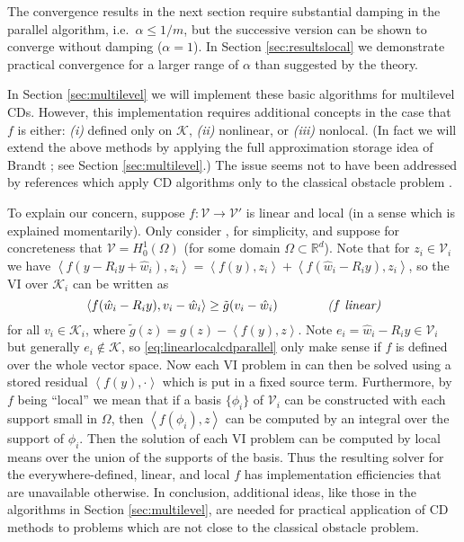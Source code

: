 \documentclass[letterpaper,final,12pt,reqno]{amsart}
\theoremstyle{cstyle}
\theoremstyle{dstyle}
\numberwithin{equation}{section}
\numberwithin{figure}{section}
\numberwithin{table}{section}
\numberwithin{theorem}{section}
\newcommand{\RR}{\mathbb{R}}
\newcommand{\cK}{\mathcal{K}}
\newcommand{\cV}{\mathcal{V}}
\newcommand{\ip}[2]{\left<#1,#2\right>}
\begin{document}
The convergence results in the next section require substantial damping in the parallel algorithm, i.e.~$\alpha \le 1/m$, but the successive version can be shown to converge without damping ($\alpha=1$).  In Section \ref{sec:resultslocal} we demonstrate practical convergence for a larger range of $\alpha$ than suggested by the theory.  %

In Section \ref{sec:multilevel} we will implement these basic algorithms for multilevel CDs.  However, this implementation requires additional concepts in the case that $f$ is either: \emph{(i)} defined only on $\cK$, \emph{(ii)} nonlinear, or \emph{(iii)} nonlocal.  (In fact we will extend the above methods by applying the full approximation storage idea of Brandt \cite{Brandt1977}; see Section \ref{sec:multilevel}.)  The issue seems not to have been addressed by references which apply CD algorithms only to the classical obstacle problem \cite[in particular]{GraeserKornhuber2009,Tai2003}.

To explain our concern, suppose $f:\cV \to \cV'$ is linear and local (in a sense which is explained momentarily).  Only consider , for simplicity, and suppose for concreteness that $\cV = H_0^1(\Omega)$ (for some domain $\Omega \subset \RR^d$).  Note that for $z_i \in \cV_i$ we have $\ip{f(y - R_i y + \hat w_i)}{z_i} = \ip{f(y)}{z_i} + \ip{f(\hat w_i - R_i y)}{z_i}$, so the VI over $\cK_i$ can be written as
\begin{equation}
\ip{f(\hat w_i - R_i y)}{v_i-\hat w_i} \ge \tilde g(v_i-\hat w_i)  \qquad\qquad \text{\emph{($f$ linear)}} \label{eq:linearlocalcdparallel}
\end{equation}
for all $v_i\in \cK_i$, where $\tilde g(z) = g(z) - \ip{f(y)}{z}$.  Note $e_i = \hat w_i - R_i y \in \cV_i$ but generally $e_i \notin \cK$, so \eqref{eq:linearlocalcdparallel} only make sense if $f$ is defined over the whole vector space.  Now each VI problem in  can then be solved using a stored residual $\ip{f(y)}{\cdot}$ which is put in a fixed source term.  Furthermore, by $f$ being ``local'' we mean that if a basis $\{\phi_i\}$ of $\cV_i$ can be constructed with each support small in $\Omega$, then $\ip{f(\phi_i)}{z}$ can be computed by an integral over the support of $\phi_i$.  Then the solution of each VI problem \label{eq:linearlocalcdparallel} can be computed by local means over the union of the supports of the basis.  Thus the resulting solver for the everywhere-defined, linear, and local $f$ has implementation efficiencies that are unavailable otherwise.  In conclusion, additional ideas, like those in the algorithms in Section \ref{sec:multilevel}, are needed for practical application of CD methods to problems which are not close to the classical obstacle problem.
\end{document}
